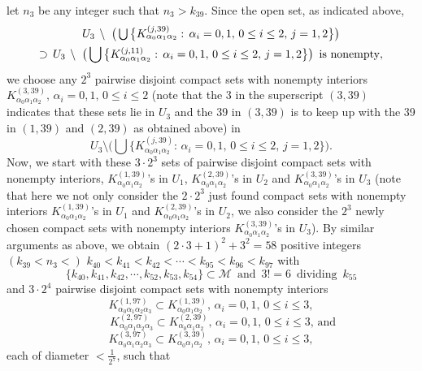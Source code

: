 \documentclass[12pt]{article}
\newcommand{\al}{\alpha}
\begin{document}
let $n_3$ be any integer such that $n_3 > k_{39}$.  Since the open set, as indicated above, 
\begin{multline*}
$$
U_3 \, \setminus \ \big( \bigcup \big\{ K_{\al_0\al_1\al_2}^{(j,39)}: \, \al_i = 0, 1, \, 0 \le i \le 2, \, j = 1, 2 \big\} \big) \\
\supset \, U_3 \, \setminus \ \big( \bigcup \big\{ K_{\al_0\al_1\al_2}^{(j,11)}: \, \al_i = 0, 1, \, 0 \le i \le 2, \, j = 1, 2 \big\} \big) \,\,\, \text{is nonempty},
$$
\end{multline*}
we choose any $2^3$ pairwise disjoint compact sets with nonempty interiors $K_{\al_0\al_1\al_2}^{(3,39)}, \, \al_i = 0, 1, \, 0 \le i \le 2$ \big(note that the 3 in the superscript $(3, 39)$ indicates that these sets lie in $U_3$ and the 39 in $(3, 39)$ is to keep up with the 39 in $(1, 39)$ and $(2, 39)$ as obtained above\big) in 
$$
U_3 \setminus \bigg( \bigcup \big\{ K_{\al_0\al_1\al_2}^{(j,39)}: \, \al_i = 0, 1, \, 0 \le i \le 2, \, j = 1, 2 \big\} \bigg).
$$ 
\indent Now, we start with these $3 \cdot 2^3$ sets of pairwise disjoint compact sets with nonempty interiors, $K_{\al_0\al_1\al_2}^{(1,39)}$'s in $U_1$, $K_{\al_0\al_1\al_2}^{(2,39)}$'s in $U_2$ and $K_{\al_0\al_1\al_2}^{(3,39)}$'s in $U_3$ \big(note that here we not only consider the $2 \cdot 2^3$ just found compact sets with nonempty interiors $K_{\al_0\al_1\al_2}^{(1,39)}$'s in $U_1$ and $K_{\al_0\al_1\al_2}^{(2,39)}$'s in $U_2$, we also consider the $2^3$ newly chosen compact sets with nonempty interiors $K_{\al_0\al_1\al_2}^{(3,39)}$'s in $U_3$\big).  By similar arguments as above, we obtain $(2 \cdot 3+1)^2 +3^2= 58$ positive integers $(k_{39} < n_3 <)$ $k_{40} < k_{41} < k_{42} < \cdots < k_{95} < k_{96} < k_{97}$ with 
$$
\{ k_{40}, k_{41}, k_{42}, \cdots, k_{52}, k_{53}, k_{54} \} \subset \mathcal M \,\,\, \text{and} \,\,\, 3! = 6 \,\,\, \text{dividing} \,\,\, k_{55}
$$
and $3 \cdot 2^4$ pairwise disjoint compact sets with nonempty interiors 
$$
K_{\al_0\al_1\al_2\al_3}^{(1,97)} \subset K_{\al_0\al_1\al_2}^{(1,39)}, \, \al_i = 0, 1, \, 0 \le i \le 3,
$$
$$
\qquad K_{\al_0\al_1\al_2\al_3}^{(2,97)} \subset K_{\al_0\al_1\al_2}^{(2,39)}, \, \al_i = 0, 1, \, 0 \le i \le 3, \, \text{and}
$$
$$
K_{\al_0\al_1\al_2\al_3}^{(3,97)} \subset K_{\al_0\al_1\al_2}^{(3,39)}, \, \al_i = 0, 1, \, 0 \le i \le 3,
$$
each of diameter $< \frac 1{2^7}$, such that 
\end{document}
